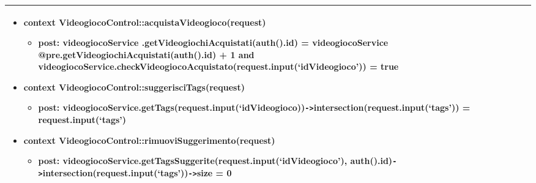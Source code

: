 \begin{tabular}{|| l | p{28em} ||}
\begin{itemize}[leftmargin=*]
	\item \textbf{context} VideogiocoControl::acquistaVideogioco(request)
	\begin{itemize}
		\item[ ] \textbf{post:} videogiocoService
		.getVideogiochiAcquistati(auth().id) =
		videogiocoService\newline 
		@pre.getVideogiochiAcquistati(auth().id) + 1
		and videogiocoService.\newline checkVideogiocoAcquistato(request.input(‘idVideogioco’)) = true	
	\end{itemize}

	\item \textbf{context} VideogiocoControl::suggerisciTags(request)
	\begin{itemize}
		\item[ ] \textbf{post:} videogiocoService\newline .getTags(request.input(‘idVideogioco))\newline \verb|->|intersection(request.input(‘tags’)) = request.input(‘tags’)
	\end{itemize}

	\item \textbf{context} VideogiocoControl::rimuoviSuggerimento(request)
	\begin{itemize}
		\item[ ] \textbf{post:} videogiocoService.getTagsSuggerite(request.input(‘idVideogioco’), auth().id)\verb|->|intersection(request.input(‘tags’))\verb|->|size = 0
	\end{itemize}
\end{itemize}\\
\hline
\end{tabular}

\newpage
